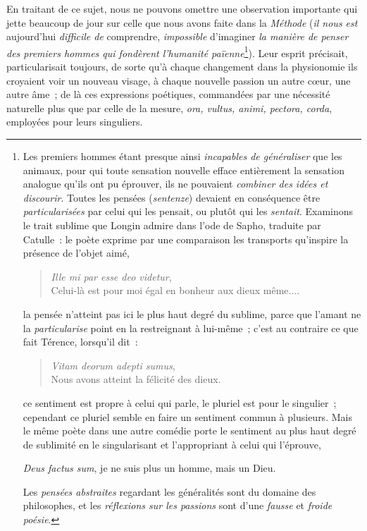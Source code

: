 \documentclass[french,twoside]{book} %
\begin{document}
En traitant de ce sujet, nous ne pouvons omettre une observation importante qui jette beaucoup de jour sur celle que nous avons faite dans la {\itshape Méthode} ({\itshape il nous est} aujourd’hui {\itshape difficile de} comprendre, {\itshape impossible} d’imaginer {\itshape la manière de penser des premiers hommes qui fondèrent l’humanité païenne}\footnote{\noindent Les premiers hommes étant presque ainsi {\itshape incapables de généraliser} que les animaux, pour qui toute sensation nouvelle efface entièrement la sensation analogue qu’ils ont pu éprouver, ils ne pouvaient {\itshape combiner des idées et discourir}. Toutes les pensées ({\itshape sentenze}) devaient en conséquence être {\itshape particularisées} par celui qui les pensait, ou plutôt qui les {\itshape sentait}. Examinons le trait sublime que Longin admire dans l’ode de Sapho, traduite par Catulle : le poète exprime par une comparaison les transports qu’inspire la présence de l’objet aimé,\par

\begin{verse}
{\itshape Ille mi par esse deo videtur},\\
Celui-là est pour moi égal en bonheur aux dieux même....\\
\end{verse}
\par
\noindent la pensée n’atteint pas ici le plus haut degré du sublime, parce que l’amant ne la {\itshape particularise} point en la restreignant à lui-même ; c’est au contraire ce que fait Térence, lorsqu’il dit :\par

\begin{verse}
{\itshape Vitam deorum adepti sumus},\\
Nous avons atteint la félicité des dieux.\\
\end{verse}
\par
\noindent ce sentiment est propre à celui qui parle, le pluriel est pour le singulier ; cependant ce pluriel semble en faire un sentiment commun à plusieurs. Mais le même poète dans une autre comédie porte le sentiment au plus haut degré de sublimité en le singularisant et l’appropriant à celui qui l’éprouve,\par
{\itshape Deus factus sum}, je ne suis plus un homme, mais un Dieu.\\
\par
\noindent Les {\itshape pensées abstraites} regardant les généralités sont du domaine des philosophes, et les {\itshape réflexions sur les passions} sont d’une {\itshape fausse} et {\itshape froide poésie}.
}). Leur esprit précisait, particularisait toujours, de  sorte qu’à chaque changement dans la physionomie ils croyaient voir un nouveau visage, à chaque nouvelle passion un autre cœur, une autre âme ; de là ces expressions poétiques, commandées par une nécessité naturelle plus que par celle de la mesure, {\itshape ora, vultus, animi, pectora, corda}, employées pour leurs singuliers.\par
\end{document}
